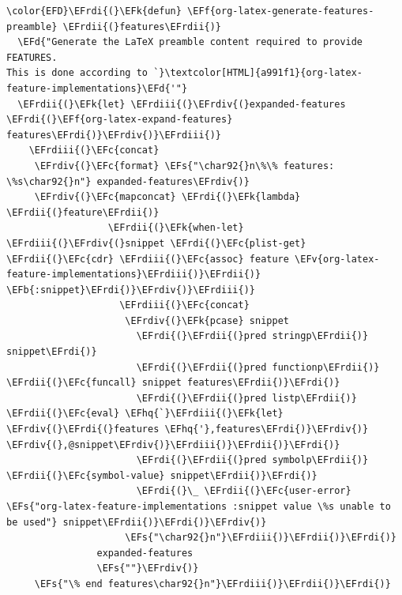 \documentclass{scrartcl}
\newcommand{\EFk}[1]{\textcolor{EFk}{#1}} %
\newcommand{\EFd}[1]{\textcolor{EFd}{#1}} %
\newcommand{\EFs}[1]{\textcolor{EFs}{#1}} %
\newcommand{\EFb}[1]{\textcolor{EFb}{#1}} %
\newcommand{\EFc}[1]{\textcolor{EFc}{#1}} %
\newcommand{\EFv}[1]{\textcolor{EFv}{#1}} %
\newcommand{\EFf}[1]{\textcolor{EFf}{#1}} %
\newcommand{\EFhq}[1]{#1} %
\newcommand{\EFrdi}[1]{#1} %
\newcommand{\EFrdii}[1]{#1} %
\newcommand{\EFrdiii}[1]{#1} %
\newcommand{\EFrdiv}[1]{#1} %
\begin{document}
\begin{Code}
\begin{Verbatim}[]
\color{EFD}\EFrdi{(}\EFk{defun} \EFf{org-latex-generate-features-preamble} \EFrdii{(}features\EFrdii{)}
  \EFd{"Generate the LaTeX preamble content required to provide FEATURES.
This is done according to `}\textcolor[HTML]{a991f1}{org-latex-feature-implementations}\EFd{'"}
  \EFrdii{(}\EFk{let} \EFrdiii{(}\EFrdiv{(}expanded-features \EFrdi{(}\EFf{org-latex-expand-features} features\EFrdi{)}\EFrdiv{)}\EFrdiii{)}
    \EFrdiii{(}\EFc{concat}
     \EFrdiv{(}\EFc{format} \EFs{"\char92{}n\%\% features: \%s\char92{}n"} expanded-features\EFrdiv{)}
     \EFrdiv{(}\EFc{mapconcat} \EFrdi{(}\EFk{lambda} \EFrdii{(}feature\EFrdii{)}
                  \EFrdii{(}\EFk{when-let} \EFrdiii{(}\EFrdiv{(}snippet \EFrdi{(}\EFc{plist-get} \EFrdii{(}\EFc{cdr} \EFrdiii{(}\EFc{assoc} feature \EFv{org-latex-feature-implementations}\EFrdiii{)}\EFrdii{)} \EFb{:snippet}\EFrdi{)}\EFrdiv{)}\EFrdiii{)}
                    \EFrdiii{(}\EFc{concat}
                     \EFrdiv{(}\EFk{pcase} snippet
                       \EFrdi{(}\EFrdii{(}pred stringp\EFrdii{)} snippet\EFrdi{)}
                       \EFrdi{(}\EFrdii{(}pred functionp\EFrdii{)} \EFrdii{(}\EFc{funcall} snippet features\EFrdii{)}\EFrdi{)}
                       \EFrdi{(}\EFrdii{(}pred listp\EFrdii{)} \EFrdii{(}\EFc{eval} \EFhq{`}\EFrdiii{(}\EFk{let} \EFrdiv{(}\EFrdi{(}features \EFhq{'},features\EFrdi{)}\EFrdiv{)} \EFrdiv{(},@snippet\EFrdiv{)}\EFrdiii{)}\EFrdii{)}\EFrdi{)}
                       \EFrdi{(}\EFrdii{(}pred symbolp\EFrdii{)} \EFrdii{(}\EFc{symbol-value} snippet\EFrdii{)}\EFrdi{)}
                       \EFrdi{(}\_ \EFrdii{(}\EFc{user-error} \EFs{"org-latex-feature-implementations :snippet value \%s unable to be used"} snippet\EFrdii{)}\EFrdi{)}\EFrdiv{)}
                     \EFs{"\char92{}n"}\EFrdiii{)}\EFrdii{)}\EFrdi{)}
                expanded-features
                \EFs{""}\EFrdiv{)}
     \EFs{"\% end features\char92{}n"}\EFrdiii{)}\EFrdii{)}\EFrdi{)}
\end{Verbatim}
\end{Code}
\end{document}
